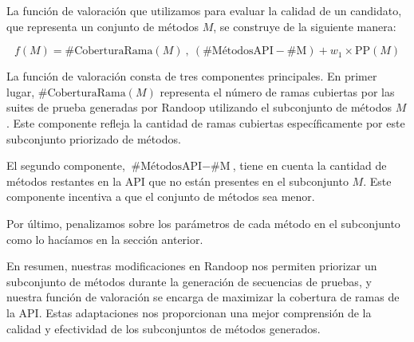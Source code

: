 La función de valoración que utilizamos para evaluar la calidad de un candidato, que representa un conjunto de métodos $M$, se construye de la siguiente manera:

{\small
\[
f(M) = \text{{\#CoberturaRama}}(M) \ , \ (\text{{\#MétodosAPI}} - \text{{\#M}}) + w_1 \times \text{{PP}}(M)
\]
}

La función de valoración consta de tres componentes principales. En primer lugar, $\text{{\#CoberturaRama}}(M)$ representa el número de ramas cubiertas por las suites de prueba generadas por Randoop utilizando el subconjunto de métodos $M$. Este componente refleja la cantidad de ramas cubiertas específicamente por este subconjunto priorizado de métodos.

El segundo componente, $\text{{\#MétodosAPI}} - \text{{\#M}}$, tiene en cuenta la cantidad de métodos restantes en la API que no están presentes en el subconjunto $M$. Este componente incentiva a que el conjunto de métodos sea menor.

Por último, penalizamos sobre los parámetros de cada método en el subconjunto como lo hacíamos en la sección anterior.

En resumen, nuestras modificaciones en Randoop nos permiten priorizar un subconjunto de métodos durante la generación de secuencias de pruebas, y nuestra función de valoración se encarga de maximizar la cobertura de ramas de la API. Estas adaptaciones nos proporcionan una mejor comprensión de la calidad y efectividad de los subconjuntos de métodos generados.

